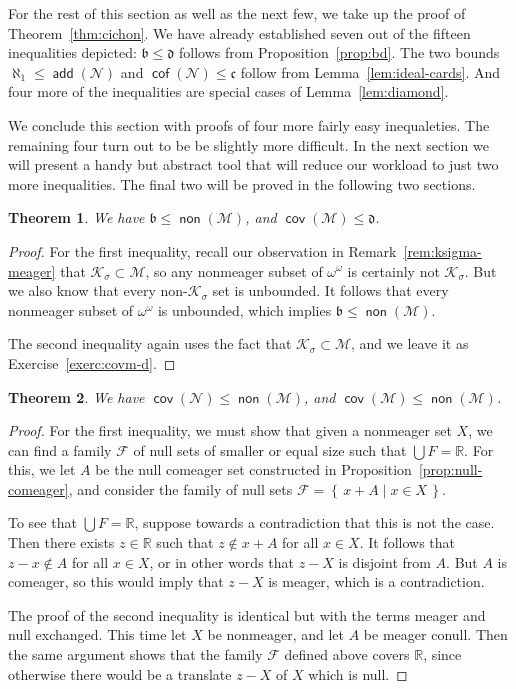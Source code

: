 \documentclass[11pt,oneside,a4paper]{amsbook}
\newcommand{\set}[1]{\left\{\,#1\,\right\}}
\newcommand{\R}{\mathbb R}
\newcommand{\Null}{\mathcal N}
\newcommand{\Meager}{\mathcal M}
\newcommand{\Ksigma}{\mathcal K_\sigma}
\DeclareMathOperator{\add}{\mathsf{add}}
\DeclareMathOperator{\non}{\mathsf{non}}
\DeclareMathOperator{\cov}{\mathsf{cov}}
\DeclareMathOperator{\cof}{\mathsf{cof}}
\theoremstyle{definition}
\theoremstyle{plain}
\newtheorem{theorem}{Theorem}[section]
\theoremstyle{definition}
\theoremstyle{remark}
\numberwithin{equation}{section}
\numberwithin{figure}{section}
\begin{document}
For the rest of this section as well as the next few, we take up the proof of Theorem~\ref{thm:cichon}. We have already established seven out of the fifteen inequalities depicted: $\mathfrak b\leq\mathfrak d$ follows from Proposition~\ref{prop:bd}. The two bounds $\aleph_1\leq\add(\Null)$ and $\cof(\Null)\leq\mathfrak c$ follow from Lemma~\ref{lem:ideal-cards}. And four more of the inequalities are special cases of Lemma~\ref{lem:diamond}.

We conclude this section with proofs of four more fairly easy inequaleties. The remaining four turn out to be be slightly more difficult. In the next section we will present a handy but abstract tool that will reduce our workload to just two more inequalities. The final two will be proved in the following two sections.

\begin{theorem}
  \label{thm:b-nonm}
  We have $\mathfrak b\leq\non(\Meager)$, and $\cov(\Meager)\leq\mathfrak d$.
\end{theorem}

\begin{proof}
  For the first inequality, recall our observation in Remark~\ref{rem:ksigma-meager} that $\Ksigma\subset\Meager$, so any nonmeager subset of $\omega^\omega$ is certainly not $\Ksigma$. But we also know that every non-$\Ksigma$ set is unbounded. It follows that every nonmeager subset of $\omega^\omega$ is unbounded, which implies $\mathfrak b\leq\non(\Meager)$.

  The second inequality again uses the fact that $\Ksigma\subset\Meager$, and we leave it as Exercise~\ref{exerc:covm-d}.
\end{proof}

\begin{theorem}
  \label{thm:covn-nonm}
  We have $\cov(\Null)\leq\non(\Meager)$, and $\cov(\Meager)\leq\non(\Meager)$.
\end{theorem}

\begin{proof}
  For the first inequality, we must show that given a nonmeager set $X$, we can find a family $\mathcal F$ of null sets of smaller or equal size such that $\bigcup F=\R$. For this, we let $A$ be the null comeager set constructed in Proposition~\ref{prop:null-comeager}, and consider the family of null sets $\mathcal F=\set{x+A\mid x\in X}$.

  To see that $\bigcup F=\R$, suppose towards a contradiction that this is not the case. Then there exists $z\in\R$ such that $z\notin x+A$ for all $x\in X$. It follows that $z-x\notin A$ for all $x\in X$, or in other words that $z-X$ is disjoint from $A$. But $A$ is comeager, so this would imply that $z-X$ is meager, which is a contradiction.

  The proof of the second inequality is identical but with the terms meager and null exchanged. This time let $X$ be nonmeager, and let $A$ be meager conull. Then the same argument shows that the family $\mathcal F$ defined above covers $\R$, since otherwise there would be a translate $z-X$ of $X$ which is null.
\end{proof}
\end{document}
